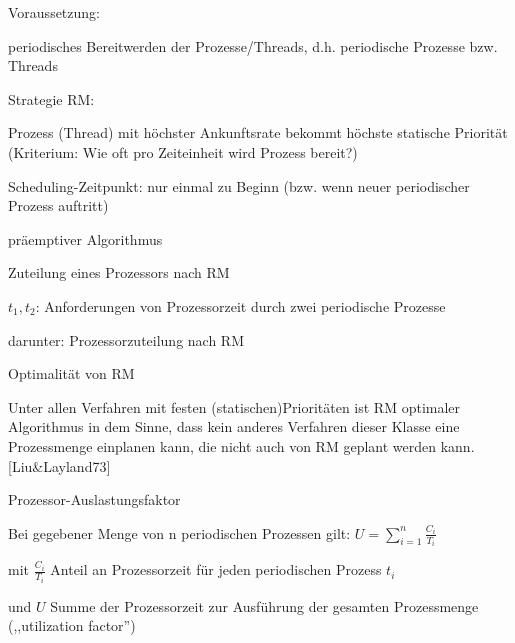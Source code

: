 \documentclass[a4paper]{article}
\begin{document}
\begin{multicols}{3}
    \begin{itemize*}
        \item
        Voraussetzung:
        \begin{itemize*}
            \item periodisches Bereitwerden der Prozesse/Threads, d.h. periodische Prozesse bzw. Threads
        \end{itemize*}
        \item
        Strategie RM:
        \begin{itemize*}
            \item Prozess (Thread) mit höchster Ankunftsrate bekommt höchste statische Priorität (Kriterium: Wie oft pro Zeiteinheit wird Prozess bereit?)
            \item Scheduling-Zeitpunkt: nur einmal zu Beginn (bzw. wenn neuer periodischer Prozess auftritt)
            \item präemptiver Algorithmus
        \end{itemize*}
        \item
        \begin{itemize*}
            \item Zuteilung eines Prozessors nach RM
            \item $t_1, t_2$: Anforderungen von Prozessorzeit durch zwei periodische Prozesse
            \item darunter: Prozessorzuteilung nach RM
        \end{itemize*}
        \item
        Optimalität von RM
        \begin{itemize*}
            \item Unter allen Verfahren mit festen (statischen)Prioritäten ist RM optimaler Algorithmus in dem Sinne, dass kein anderes Verfahren dieser Klasse eine Prozessmenge einplanen kann, die nicht auch von RM geplant werden kann. [Liu\&Layland73]
        \end{itemize*}
        \item
        Prozessor-Auslastungsfaktor
        \begin{itemize*}
            \item Bei gegebener Menge von n periodischen Prozessen gilt: $U=\sum_{i=1}^n  \frac{C_i}{T_i}$
            \item mit $\frac{C_i}{T_i}$ Anteil an Prozessorzeit für jeden periodischen Prozess $t_i$
            \item und $U$ Summe der Prozessorzeit zur Ausführung der gesamten Prozessmenge (,,utilization factor'')

\end{itemize*}
\end{itemize*}
\end{multicols}
\end{document}
